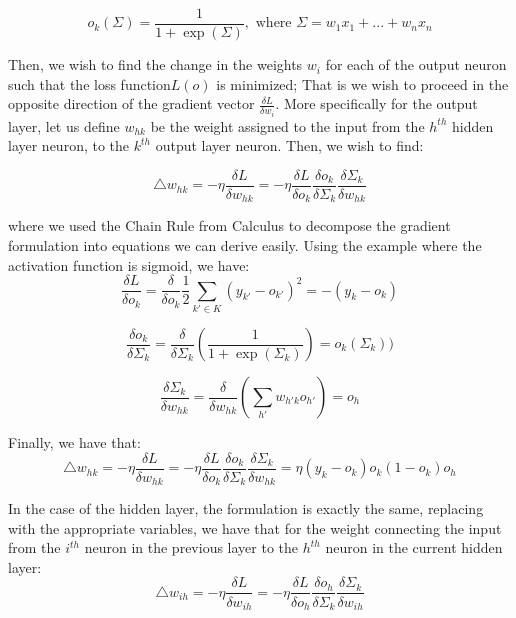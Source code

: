 \documentclass[12pt]{article}
\begin{document}
\begin{equation*}
o_k(\Sigma) = \frac{1}{1 + \exp(\Sigma)}, \text{ where } \Sigma = w_1x_1 + ... + w_nx_n
\end{equation*}

Then, we wish to find the change in the weights $w_i$ for each of the output neuron such that the loss function$L(o)$ is minimized; That is we wish to proceed in the opposite direction of the gradient vector $\frac{\delta L}{\delta w_i}$. More specifically for the output layer, let us define $w_{hk}$ be the weight assigned to the input from the $h^{th}$ hidden layer neuron, to the $k^{th}$ output layer neuron. Then, we wish to find:

\begin{equation*}
\triangle w_{hk} = -\eta \frac{\delta L}{\delta w_{hk}} = - \eta  \frac{\delta L}{\delta o_k} \frac{\delta o_k}{\delta \Sigma_k} \frac{\delta \Sigma_k}{\delta w_{hk}} 
\end{equation*}

where we used the Chain Rule from Calculus to decompose the gradient formulation into equations we can derive easily. Using the example where the activation function is sigmoid, we have:
\begin{equation*}
\frac{\delta L}{\delta o_k} = \frac{\delta }{\delta o_k} \frac{1}{2} \sum_{k' \in K} (y_{k'} - o_{k'})^2  = - (y_k - o_k)
\end{equation*}
 
\begin{equation*}
 \frac{\delta o_k}{\delta \Sigma_k} =  \frac{\delta}{\delta \Sigma_k} ( \frac{1}{1 + \exp(\Sigma_k)}) = o_k(\Sigma_k))
\end{equation*}

\begin{equation*}
 \frac{\delta \Sigma_k}{\delta w_{hk}} =   \frac{\delta }{\delta w_{hk}} (\sum_{h'} w_{h'k} o_{h'}) = o_h
\end{equation*}

Finally, we have that:
\begin{equation*}
\triangle w_{hk} = -\eta \frac{\delta L}{\delta w_{hk}} = - \eta  \frac{\delta L}{\delta o_k} \frac{\delta o_k}{\delta \Sigma_k} \frac{\delta \Sigma_k}{\delta w_{hk}} = \eta (y_k - o_k)o_k(1 - o_k)o_h
\end{equation*}

In the case of the hidden layer, the formulation is exactly the same, replacing with the appropriate variables, we have that for the weight connecting the input from the $i^{th}$ neuron in the previous layer to the $h^{th}$ neuron in the current hidden layer:
\begin{equation*}
\triangle w_{ih} = -\eta \frac{\delta L}{\delta w_{ih}} = - \eta  \frac{\delta L}{\delta o_h} \frac{\delta o_h}{\delta \Sigma_k} \frac{\delta \Sigma_k}{\delta w_{ih}} 
\end{equation*}
\end{document}
